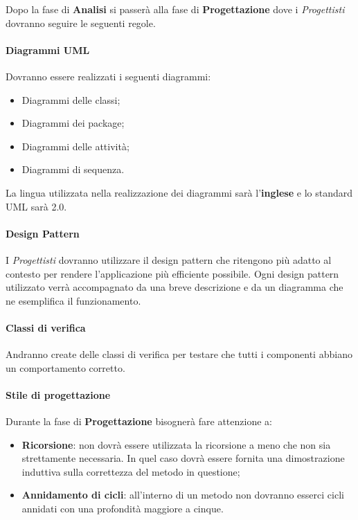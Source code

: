 Dopo la fase di \textbf{Analisi} si passerà alla fase di \textbf{Progettazione} dove i \textit{Progettisti} dovranno seguire le seguenti regole.\\
\paragraph{Diagrammi UML}
Dovranno essere realizzati i seguenti diagrammi:
\begin{itemize}
	\item Diagrammi delle classi;
	\item Diagrammi dei package;
	\item Diagrammi delle attività;
	\item Diagrammi di sequenza.
\end{itemize}
La lingua utilizzata nella realizzazione dei diagrammi sarà l'\textbf{inglese} e lo standard \gls{UML} sarà 2.0.

\paragraph{Design Pattern}
I \textit{Progettisti} dovranno utilizzare il \gls{design pattern} che ritengono più adatto al contesto per rendere l'applicazione più efficiente possibile. Ogni \gls{design pattern} utilizzato verrà accompagnato da una breve descrizione e da un diagramma che ne esemplifica il funzionamento.

\paragraph{Classi di verifica}
Andranno create delle classi di verifica per testare che tutti i componenti abbiano un comportamento corretto.

\paragraph{Stile di progettazione}
Durante la fase di \textbf{Progettazione} bisognerà fare attenzione a:
\begin{itemize}
	\item \textbf{Ricorsione}: non dovrà essere utilizzata la ricorsione a meno che non sia strettamente necessaria. In quel caso dovrà essere fornita una dimostrazione induttiva sulla correttezza del metodo in questione;
	\item \textbf{Annidamento di cicli}: all'interno di un metodo non dovranno esserci cicli annidati con una profondità maggiore a cinque.
\end{itemize}




